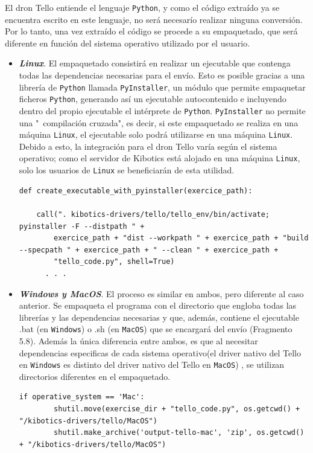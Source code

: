 \documentclass{report}
\begin{document}
El dron Tello entiende el lenguaje \texttt{Python}, y como el código extraído ya se encuentra escrito en este lenguaje, no será necesarío realizar ninguna conversión. Por lo tanto, una vez extraído el código se procede a su empaquetado, que será diferente en función del sistema operativo utilizado por el usuario.
\\
\begin{itemize}
	\item \textit{\textbf{Linux}}. El empaquetado consistirá en realizar un ejecutable que contenga todas las dependencias necesarias para el envío. Esto es posible gracias a una librería de \texttt{Python} llamada \texttt{PyInstaller}, un módulo que permite empaquetar ficheros \texttt{Python}, generando así un ejecutable autocontenido e incluyendo dentro del propio ejecutable el intérprete de \texttt{Python}. \texttt{PyInstaller} no permite una "\ compilación cruzada", es decir, si este empaquetado se realiza en una máquina \texttt{Linux}, el ejecutable solo podrá utilizarse en una máquina \texttt{Linux}. Debido a esto, la integración para el dron Tello varía según el sistema operativo; como el servidor de Kibotics está alojado en una máquina \texttt{Linux}, solo los usuarios de \texttt{Linux} se beneficiarán de esta utilidad.
\begin{lstlisting}[frame=single,breaklines=true, label=Creación ejecutable con PyInstaller, caption=Creación ejecutable con PyInstaller,  captionpos=b]
   def create_executable_with_pyinstaller(exercice_path):
    		      
   	call(". kibotics-drivers/tello/tello_env/bin/activate; pyinstaller -F --distpath " +
      	exercice_path + "dist --workpath " + exercice_path + "build --specpath " + exercice_path + " --clean " + exercice_path +
      	"tello_code.py", shell=True)
      . . . 
\end{lstlisting}
	
	
	\item \textit{\textbf{Windows y MacOS}}. El proceso es similar en ambos, pero diferente al caso anterior. Se empaqueta el programa con el directorio que engloba todas las librerías y las dependencias necesarias y que, además, contiene el ejecutable .bat (en \texttt{Windows}) o .sh (en \texttt{MacOS}) que se encargará del envío (Fragmento 5.8). Además la única diferencia entre ambos, es que al necesitar dependencias especificas de cada sistema operativo(el driver nativo del Tello en \texttt{Windows} es distinto del driver nativo del Tello en \texttt{MacOS}) , se utilizan directorios diferentes en el empaquetado.
	\\
\begin{lstlisting}[frame=single,breaklines=true, label=Creación empaquetado en Windows y MacOS, caption=Creación empaquetado y respuesta en Windows y MacOS,  captionpos=b]
   if operative_system == 'Mac':
        shutil.move(exercise_dir + "tello_code.py", os.getcwd() + "/kibotics-drivers/tello/MacOS")
        shutil.make_archive('output-tello-mac', 'zip', os.getcwd() + "/kibotics-drivers/tello/MacOS")


\end{lstlisting}
\end{itemize}
\end{document}
